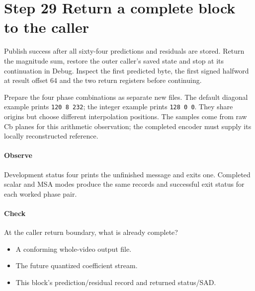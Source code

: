 \section{Step 29 Return a complete block to the caller}\label{h263-prediction-s09}
Publish success after all sixty-four predictions and residuals are stored.
Return the magnitude sum, restore the outer caller's saved state and stop at its
continuation in Debug. Inspect the first predicted byte, the first signed
halfword at result offset 64 and the two return registers before continuing.

Prepare the four phase combinations as separate new files. The default diagonal
example prints \texttt{120 8 232}; the integer example prints \texttt{128 0 0}.
They share origins but choose different interpolation positions. The samples
come from raw Cb planes for this arithmetic observation; the completed encoder
must supply its locally reconstructed reference.

\paragraph{Observe} Development status four prints the unfinished message and
exits one. Completed scalar and MSA modes produce the same records and successful
exit status for each worked phase pair.
\paragraph{Check} At the caller return boundary, what is already complete?
\begin{itemize}
  \item[A.] A conforming whole-video output file.
  \item[B.] The future quantized coefficient stream.
  \item[C.] This block's prediction/residual record and returned status/SAD.
\end{itemize}
